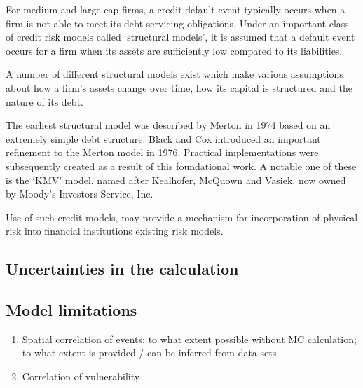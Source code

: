 \documentclass[a4paper,11pt]{extarticle} %
\begin{document}
For medium and large cap firms, a credit default event typically occurs when a firm is not able to meet its debt servicing obligations. Under an important class of credit risk models called `structural models', it is assumed that a default event occurs for a firm when its assets are sufficiently low compared to its liabilities. 

A number of different structural models exist which make various assumptions about how a firm's assets change over time, how its capital is structured and the nature of its debt. 

The earliest structural model was described by Merton in 1974 \cite{Merton:1974} based on an extremely simple debt structure. Black and Cox \cite{BlackCox:1976} introduced an important refinement to the Merton model in 1976. Practical implementations were subsequently created as a result of this foundational work. A notable one of these is the `KMV' model, named after Kealhofer, McQuown and Vasiek, now owned by Moody's Investors Service, Inc.  

Use of such credit models, may provide a mechanism for incorporation of physical risk into financial institutions existing risk models\cite{KenyonEtAl:2021}. 

\subsection{Uncertainties in the calculation}

\subsection{Model limitations}

\begin{enumerate}
	\item Spatial correlation of events: to what extent possible without MC calculation; to what extent is provided / can be inferred from data sets
	\item Correlation of vulnerability
\end{enumerate}






\clearpage


%

%
\end{document}
